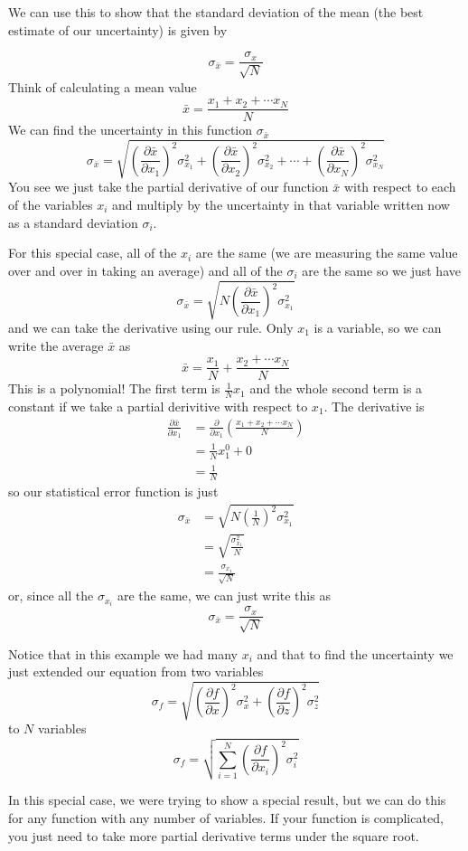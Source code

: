 \documentclass[twoside,11pt,ShortChapTitles]{BYUTextbook}
\begin{document}
We can use this to show that the standard deviation of the mean (the best
estimate of our uncertainty) is given by

\[
\sigma_{\bar{x}}=\frac{\sigma_{x}}{\sqrt{N}}
\]
Think of calculating a mean value
\[
\bar{x}=\frac{x_{1}+x_{2}+\cdots x_{N}}{N}
\]
We can find the uncertainty in this function $\sigma_{\bar{x}}$
\[
\sigma_{\bar{x}}=\sqrt{\left(  \frac{\partial\bar{x}}{\partial x_{1}}\right)
^{2}\sigma_{x_{1}}^{2}+\left(  \frac{\partial\bar{x}}{\partial x_{2}}\right)
^{2}\sigma_{x_{2}}^{2}+\cdots+\left(  \frac{\partial\bar{x}}{\partial x_{N}
}\right)  ^{2}\sigma_{x_{N}}^{2}}
\]
You see we just take the partial derivative of our function $\bar{x}$ with
respect to each of the variables $x_{i}$ and multiply by the uncertainty in
that variable written now as a standard deviation $\sigma_{i}.$

For this special case, all of the $x_{i}$ are the same (we are measuring the
same value over and over in taking an average) and all of the $\sigma_{i}$ are
the same so we just have
\[
\sigma_{\bar{x}}=\sqrt{N\left(  \frac{\partial\bar{x}}{\partial x_{1}}\right)
^{2}\sigma_{x_{1}}^{2}}
\]
and we can take the derivative using our rule. Only $x_{1}$ is a variable, so
we can write the average $\bar{x}$ as
\[
\bar{x}=\frac{x_{1}}{N}+\frac{x_{2}+\cdots x_{N}}{N}
\]
This is a polynomial! The first term is $\frac{1}{N}x_{1}$ and the whole
second term is a constant if we take a partial derivitive with respect to
$x_{1}$. The derivative is
\begin{align*}
\frac{\partial\bar{x}}{\partial x_{1}}  & =\frac{\partial}{\partial x_{1}
}\left(  \frac{x_{1}+x_{2}+\cdots x_{N}}{N}\right) \\
& =\frac{1}{N}x_{1}^{0}+0\\
& =\frac{1}{N}
\end{align*}
so our statistical error function is just
\begin{align*}
\sigma_{\bar{x}}  & =\sqrt{N\left(  \frac{1}{N}\right)  ^{2}\sigma_{x_{1}}
^{2}}\\
& =\sqrt{\frac{\sigma_{x_{1}}^{2}}{N}}\\
& =\frac{\sigma_{x_{1}}}{\sqrt{N}}
\end{align*}
or, since all the $\sigma_{x_{i}}$ are the same, we can just write this as
\[
\sigma_{\bar{x}}=\frac{\sigma_{x}}{\sqrt{N}}
\]


Notice that in this example we had many $x_{i}$ and that to find the
uncertainty we just extended our equation from two variables
\[
\sigma_{f}=\sqrt{\left(  \frac{\partial f}{\partial x}\right)  ^{2}\sigma
_{x}^{2}+\left(  \frac{\partial f}{\partial z}\right)  ^{2}\sigma_{z}^{2}}
\]
to $N$ variables
\[
\sigma_{f}=\sqrt{\sum_{i=1}^{N}\left(  \frac{\partial f}{\partial x_{i}
}\right)  ^{2}\sigma_{i}^{2}}
\]


In this special case, we were trying to show a special result, but we can do
this for any function with any number of variables. If your function is
complicated, you just need to take more partial derivative terms under the
square root.
\end{document}
